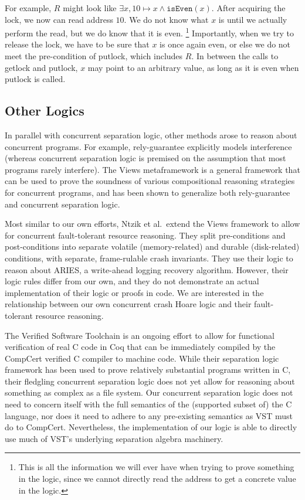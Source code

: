 For example, $R$ might look like $\exists x, 10\mapsto x \wedge
\texttt{isEven}(x)$.
After acquiring the lock, we now can read address $10$.
We do not know what $x$ is until we actually perform the read, but we do know
that it is even.
\footnote{This is all the information we will ever have when
trying to prove something in the logic, since we cannot directly read the
address to get a concrete value in the logic.}
Importantly, when we try to
release the lock, we have to be sure that $x$ is once again even, or else we do
not meet the pre-condition of putlock, which includes $R$.
In between the calls
to getlock and putlock, $x$ may point to an arbitrary value, as long as it is
even when putlock is called.

\subsection{Other Logics}

In parallel with concurrent separation logic, other methods arose to
reason about concurrent programs.
For example,
rely-guarantee\cite{jones1981development} explicitly models interference
(whereas concurrent separation logic is premised on the assumption that most
programs rarely interfere).
The Views metaframework\cite{dinsdale2013views} is a
general framework that can be used to prove the soundness of various
compositional reasoning strategies for concurrent programs, and has been shown
to generalize both rely-guarantee and concurrent separation logic.

Most similar to our own efforts, Ntzik et al.\ extend the Views framework to
allow for concurrent fault-tolerant resource reasoning\cite{ntzik2015fault}.
They split pre-conditions and post-conditions into separate volatile
(memory-related) and durable (disk-related) conditions, with separate,
frame-rulable crash invariants.
They use their logic to reason about
ARIES\cite{ntzik2015fault}, a write-ahead logging recovery algorithm.
However,
their logic rules differ from our own, and they do not demonstrate an actual
implementation of their logic or proofs in code.
We are interested in the
relationship between our own concurrent crash Hoare logic and their
fault-tolerant resource reasoning.

The Verified Software Toolchain\cite{appel2014program} is an ongoing effort to
allow for functional verification of real C code in Coq that can be immediately
compiled by the CompCert\cite{leroy2009formal} verified C compiler to machine
code.
While their separation logic framework has been used to prove relatively
substantial programs written in C, their fledgling concurrent separation logic
does not yet allow for reasoning about something as complex as a file system.
Our concurrent separation logic does not need to concern itself with the full
semantics of the (supported subset of) the C language, nor does it need to
adhere to any pre-existing semantics as VST must do to CompCert.
Nevertheless,
the implementation of our logic is able to directly use much of VST's underlying
separation algebra machinery.

